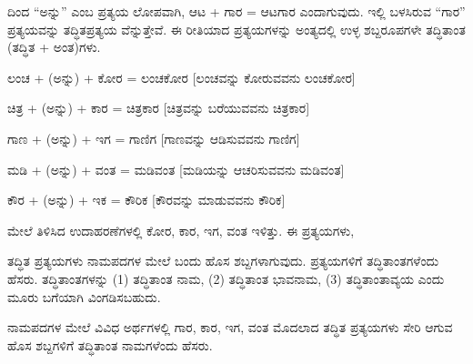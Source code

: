 \kbvcontinued ದಿಂದ “ಅನ್ನು” ಎಂಬ ಪ್ರತ್ಯಯ ಲೋಪವಾಗಿ, ಆಟ + ಗಾರ = ಆಟಗಾರ ಎಂದಾಗುವುದು. ಇಲ್ಲಿ ಬಳಸಿರುವ “ಗಾರ” ಪ್ರತ್ಯಯವನ್ನು ತದ್ಧಿತಪ್ರತ್ಯಯ ವೆನ್ನುತ್ತೇವೆ. ಈ ರೀತಿಯಾದ ಪ್ರತ್ಯಯಗಳನ್ನು ಅಂತ್ಯದಲ್ಲಿ ಉಳ್ಳ ಶಬ್ದರೂಪಗಳೇ ತದ್ಧಿತಾಂತ (ತದ್ಧಿತ + ಅಂತ)ಗಳು.\par


\vspace{2.5pt plus 3pt minus 0.5pt}\noindent\hspace*{1.2em}\hspace{0.55em}ಲಂಚ + (ಅನ್ನು) + ಕೋರ = ಲಂಚಕೋರ {[}ಲಂಚವನ್ನು ಕೋರುವವನು ಲಂಚಕೋರ{]}\par

\vspace{2.5pt plus 3pt minus 0.5pt}\noindent\hspace*{1.2em}\hspace{0.55em}ಚಿತ್ರ + (ಅನ್ನು) + ಕಾರ = ಚಿತ್ರಕಾರ {[}ಚಿತ್ರವನ್ನು ಬರೆಯುವವನು ಚಿತ್ರಕಾರ{]}\par

\vspace{2.5pt plus 3pt minus 0.5pt}\noindent\hspace*{1.2em}\hspace{0.55em}ಗಾಣ + (ಅನ್ನು) + ಇಗ = ಗಾಣಿಗ {[}ಗಾಣವನ್ನು ಆಡಿಸುವವನು ಗಾಣಿಗ{]}\par

\vspace{2.5pt plus 3pt minus 0.5pt}\noindent\hspace*{1.2em}\hspace{0.55em}ಮಡಿ + (ಅನ್ನು) + ವಂತ = ಮಡಿವಂತ {[}ಮಡಿಯನ್ನು ಆಚರಿಸುವವನು ಮಡಿವಂತ{]}\par

\vspace{2.5pt plus 3pt minus 0.5pt}\noindent\hspace*{1.2em}\hspace{0.55em}ಕೌರ + (ಅನ್ನು) + ಇಕ = ಕೌರಿಕ {[}ಕೌರವನ್ನು ಮಾಡುವವನು ಕೌರಿಕ{]}\par

\indent ಮೇಲೆ ತಿಳಿಸಿದ ಉದಾಹರಣೆಗಳಲ್ಲಿ ಕೋರ, ಕಾರ, ಇಗ, ವಂತ ಇಳಿತ್ತು. ಈ ಪ್ರತ್ಯಯಗಳು,\par

\begin{kbvrule}
\noindent\kbvbullet\hspace{0.5em}ತದ್ಧಿತ ಪ್ರತ್ಯಯಗಳು ನಾಮಪದಗಳ ಮೇಲೆ ಬಂದು ಹೊಸ ಶಬ್ದಗಳಾಗುವುದು. ಪ್ರತ್ಯಯಗಳಿಗೆ ತದ್ಧಿತಾಂತಗಳೆಂದು ಹೆಸರು. ತದ್ಧಿತಾಂತಗಳನ್ನು (1) ತದ್ಧಿತಾಂತ ನಾಮ, (2) ತದ್ಧಿತಾಂತ ಭಾವನಾಮ, (3) ತದ್ಧಿತಾಂತಾವ್ಯಯ ಎಂದು ಮೂರು ಬಗೆಯಾಗಿ ವಿಂಗಡಿಸಬಹುದು.
\end{kbvrule}

\vspace{4pt plus 4pt minus 1pt}\hspace{0.5em}ನಾಮಪದಗಳ ಮೇಲೆ ವಿವಿಧ ಅರ್ಥಗಳಲ್ಲಿ ಗಾರ, ಕಾರ, ಇಗ, ವಂತ ಮೊದಲಾದ ತದ್ಧಿತ ಪ್ರತ್ಯಯಗಳು ಸೇರಿ ಆಗುವ ಹೊಸ ಶಬ್ದಗಳಿಗೆ ತದ್ಧಿತಾಂತ ನಾಮಗಳೆಂದು ಹೆಸರು.\par
